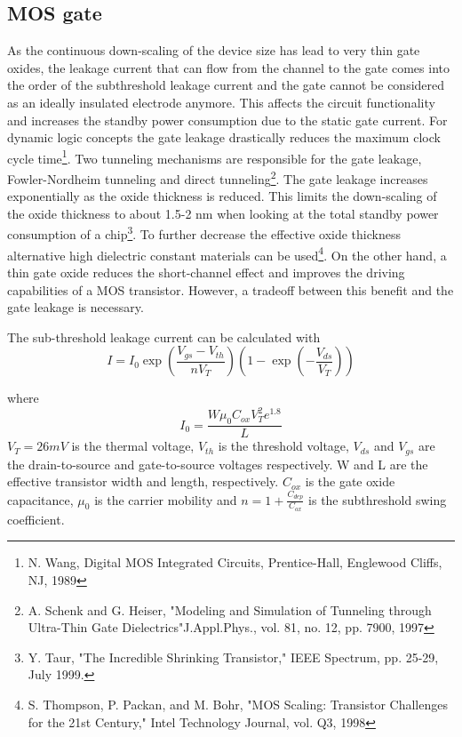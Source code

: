 \subsection{MOS gate}
As the continuous down-scaling of the device size has lead to very thin gate oxides, the leakage current that can flow from the channel to the gate comes into the order of the subthreshold leakage current and the gate cannot be considered as an ideally insulated electrode anymore.
This affects the circuit functionality and increases the standby power consumption due to the static gate current.
For dynamic logic concepts the gate leakage drastically reduces the maximum clock cycle time\footnote{N. Wang, Digital MOS Integrated Circuits, Prentice-Hall, Englewood Cliffs, NJ, 1989}.
Two tunneling mechanisms are responsible for the gate leakage, Fowler-Nordheim tunneling and direct tunneling\footnote{A. Schenk and G. Heiser, "Modeling and Simulation of Tunneling through Ultra-Thin Gate Dielectrics"J.Appl.Phys., vol. 81, no. 12, pp. 7900, 1997}.
The gate leakage increases exponentially as the oxide thickness is reduced.
This limits the down-scaling of the oxide thickness to about 1.5-2 nm when looking at the total standby power consumption of a chip\footnote{Y. Taur, "The Incredible Shrinking Transistor," IEEE Spectrum, pp. 25-29, July 1999.}.
To further decrease the effective oxide thickness alternative high dielectric constant materials can be used\footnote{S. Thompson, P. Packan, and M. Bohr, "MOS Scaling: Transistor Challenges for the 21st Century," Intel Technology Journal, vol. Q3, 1998}.
On the other hand, a thin gate oxide reduces the short-channel effect and improves the driving capabilities of a MOS transistor.
However, a tradeoff between this benefit and the gate leakage is necessary.

The sub-threshold leakage current can be calculated with
\begin{equation}
I = I_0 \exp\left(\frac{V_{gs}-V_{th}}{n V_T}\right) \left(1-\exp\left(-\frac{V_{ds}}{V_T}\right)\right)
\end{equation}

where
\begin{equation}
I_0 = \frac{W \mu_0 C_{ox} V_T^2 e^{1.8}}{L} 
\end{equation}
$V_T=26mV$ is the thermal voltage, $V_{th}$ is the threshold voltage, $V_{ds}$ and $V_{gs}$ are the drain-to-source and gate-to-source voltages respectively.
W and L are the effective transistor width and length, respectively. $C_{ox}$ is the gate oxide capacitance, $\mu_0$ is the carrier mobility and $n=1+\frac{C_{dep}}{C_{ox}}$ is the subthreshold swing coefficient. 


